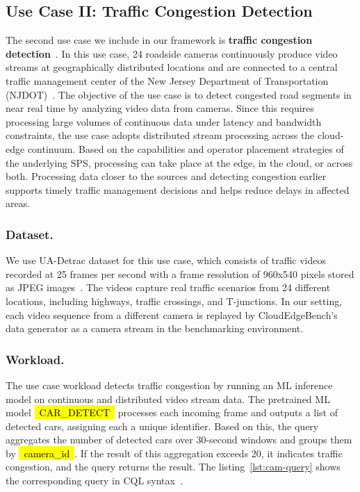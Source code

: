 \documentclass[runningheads]{llncs}
\newcommand*{\codebox}[1]{{\ttfamily\hyphenchar\font=45\relax\hl{~#1~}}}
\begin{document}
\subsection{Use Case II: Traffic Congestion Detection}
The second use case we include in our framework is \textbf{traffic congestion detection}~\cite{camera-use-case}.
In this use case, 24 roadside cameras continuously produce video streams at geographically distributed locations and are connected to a central traffic management center of the New Jersey Department of Transportation (NJDOT)~\cite{njdot}.
The objective of the use case is to detect congested road segments in near real time by analyzing video data from cameras.
Since this requires processing large volumes of continuous data under latency and bandwidth constraints, the use case adopts distributed stream processing across the cloud-edge continuum.
Based on the capabilities and operator placement strategies of the underlying SPS, processing can take place at the edge, in the cloud, or across both.
Processing data closer to the sources and detecting congestion earlier supports timely traffic management decisions and helps reduce delays in affected areas.

\subsubsection{Dataset.}
We use UA-Detrac dataset for this use case, which consists of traffic videos recorded at 25 frames per second with a frame resolution of 960x540 pixels stored as JPEG images~\cite{ua-detrac-dataset}.
The videos capture real traffic scenarios from 24 different locations, including highways, traffic crossings, and T-junctions.
In our setting, each video sequence from a different camera is replayed by CloudEdgeBench's data generator as a camera stream in the benchmarking environment.

\subsubsection{Workload.}
The use case workload detects traffic congestion by running an ML inference model on continuous and distributed video stream data.
The pretrained ML model \codebox{CAR_DETECT} processes each incoming frame and outputs a list of detected cars, assigning each a unique identifier.
Based on this, the query aggregates the number of detected cars over 30-second windows and groups them by \codebox{camera_id}.
If the result of this aggregation exceeds 20, it indicates traffic congestion, and the query returns the result.
The listing~\ref{lst:cam-query} shows the corresponding query in CQL syntax~\cite{cql}.
\end{document}
